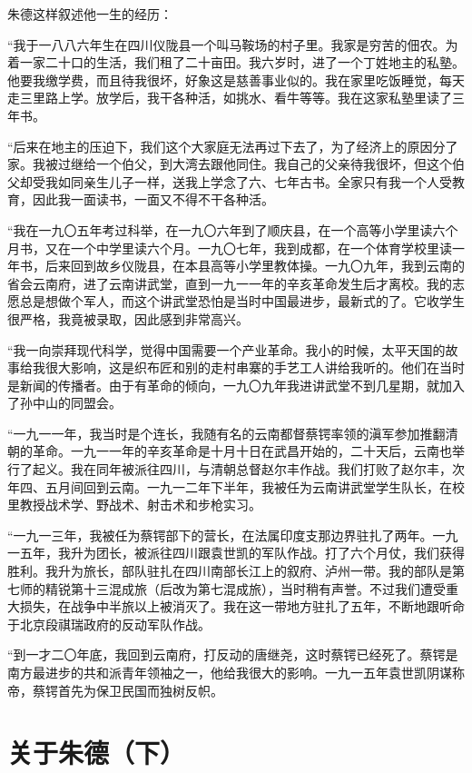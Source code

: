 \documentclass[10pt]{book}
\begin{document}
朱德这样叙述他一生的经历：

“我于一八八六年生在四川仪陇县一个叫马鞍场的村子里。我家是穷苦的佃农。为着一家二十口的生活，我们租了二十亩田。我六岁时，进了一个丁姓地主的私塾。他要我缴学费，而且待我很坏，好象这是慈善事业似的。我在家里吃饭睡觉，每天走三里路上学。放学后，我干各种活，如挑水、看牛等等。我在这家私塾里读了三年书。

“后来在地主的压迫下，我们这个大家庭无法再过下去了，为了经济上的原因分了家。我被过继给一个伯父，到大湾去跟他同住。我自己的父亲待我很坏，但这个伯父却受我如同亲生儿子一样，送我上学念了六、七年古书。全家只有我一个人受教育，因此我一面读书，一面又不得不干各种活。

“我在一九〇五年考过科举，在一九〇六年到了顺庆县，在一个高等小学里读六个月书，又在一个中学里读六个月。一九〇七年，我到成都，在一个体育学校里读一年书，后来回到故乡仪陇县，在本县高等小学里教体操。一九〇九年，我到云南的省会云南府，进了云南讲武堂，直到一九一一年的辛亥革命发生后才离校。我的志愿总是想做个军人，而这个讲武堂恐怕是当时中国最进步，最新式的了。它收学生很严格，我竟被录取，因此感到非常高兴。

“我一向崇拜现代科学，觉得中国需要一个产业革命。我小的时候，太平天国的故事给我很大影响，这是织布匠和别的走村串寨的手艺工人讲给我听的。他们在当时是新闻的传播者。由于有革命的倾向，一九〇九年我进讲武堂不到几星期，就加入了孙中山的同盟会。

“一九一一年，我当时是个连长，我随有名的云南都督蔡锷率领的滇军参加推翻清朝的革命。一九一一年的辛亥革命是十月十日在武昌开始的，二十天后，云南也举行了起义。我在同年被派往四川，与清朝总督赵尔丰作战。我们打败了赵尔丰，次年四、五月间回到云南。一九一二年下半年，我被任为云南讲武堂学生队长，在校里教授战术学、野战术、射击术和步枪实习。

“一九一三年，我被任为蔡锷部下的营长，在法属印度支那边界驻扎了两年。一九一五年，我升为团长，被派往四川跟袁世凯的军队作战。打了六个月仗，我们获得胜利。我升为旅长，部队驻扎在四川南部长江上的叙府、泸州一带。我的部队是第七师的精锐第十三混成旅（后改为第七混成旅），当时稍有声誉。不过我们遭受重大损失，在战争中半旅以上被消灭了。我在这一带地方驻扎了五年，不断地跟听命于北京段祺瑞政府的反动军队作战。

“到一才二〇年底，我回到云南府，打反动的唐继尧，这时蔡锷已经死了。蔡锷是南方最进步的共和派青年领袖之一，他给我很大的影响。一九一五年袁世凯阴谋称帝，蔡锷首先为保卫民国而独树反帜。

\section{关于朱德（下）}
\end{document}
